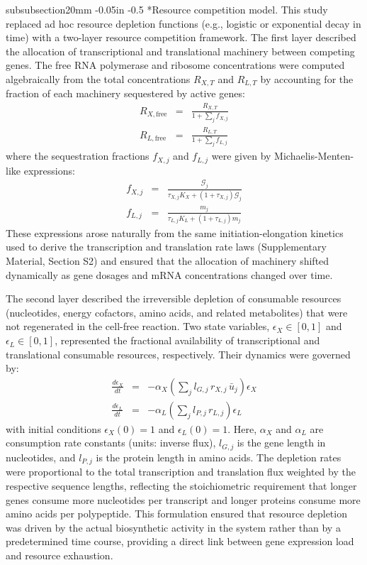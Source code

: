 \documentclass[12pt]{article}
\makeatletter
\renewcommand\subsubsection{\@startsection
	{subsubsection}{2}{0mm}
	{-0.05in}
	{-0.5\baselineskip}
	{\normalfont\normalsize\itshape}}
\makeatother
\begin{document}
\subsubsection*{Resource competition model.}
This study replaced ad hoc resource depletion functions (e.g., logistic or exponential decay in time) with a two-layer resource competition framework. The first layer described the allocation of transcriptional and translational machinery between competing genes. The free RNA polymerase and ribosome concentrations were computed algebraically from the total concentrations $R_{X,T}$ and $R_{L,T}$ by accounting for the fraction of each machinery sequestered by active genes:
\begin{eqnarray}
\label{eq:RNAP_free}
R_{X,\text{free}} &=& \frac{R_{X,T}}{1 + \displaystyle\sum_j f_{X,j}} \\
\label{eq:Ribo_free}
R_{L,\text{free}} &=& \frac{R_{L,T}}{1 + \displaystyle\sum_j f_{L,j}}
\end{eqnarray}
where the sequestration fractions $f_{X,j}$ and $f_{L,j}$ were given by Michaelis-Menten-like expressions:
\begin{eqnarray}
f_{X,j} &=& \frac{\mathcal{G}_j}{\tau_{X,j}K_X + (1 + \tau_{X,j})\mathcal{G}_j} \\
f_{L,j} &=& \frac{m_j}{\tau_{L,j}K_L + (1 + \tau_{L,j})m_j}
\end{eqnarray}
These expressions arose naturally from the same initiation-elongation kinetics used to derive the transcription and translation rate laws (Supplementary Material, Section S2) and ensured that the allocation of machinery shifted dynamically as gene dosages and mRNA concentrations changed over time.

The second layer described the irreversible depletion of consumable resources (nucleotides, energy cofactors, amino acids, and related metabolites) that were not regenerated in the cell-free reaction. Two state variables, $\epsilon_X \in [0,1]$ and $\epsilon_L \in [0,1]$, represented the fractional availability of transcriptional and translational consumable resources, respectively. Their dynamics were governed by:
\begin{eqnarray}
\label{eq:epsX}
\frac{d\epsilon_X}{dt} &=& -\alpha_X \left(\sum_j l_{G,j}\,r_{X,j}\,\bar{u}_j\right)\epsilon_X \\
\label{eq:epsL}
\frac{d\epsilon_L}{dt} &=& -\alpha_L \left(\sum_j l_{P,j}\,r_{L,j}\right)\epsilon_L
\end{eqnarray}
with initial conditions $\epsilon_X(0) = 1$ and $\epsilon_L(0) = 1$. Here, $\alpha_X$ and $\alpha_L$ are consumption rate constants (units: inverse flux), $l_{G,j}$ is the gene length in nucleotides, and $l_{P,j}$ is the protein length in amino acids. The depletion rates were proportional to the total transcription and translation flux weighted by the respective sequence lengths, reflecting the stoichiometric requirement that longer genes consume more nucleotides per transcript and longer proteins consume more amino acids per polypeptide. This formulation ensured that resource depletion was driven by the actual biosynthetic activity in the system rather than by a predetermined time course, providing a direct link between gene expression load and resource exhaustion.
\end{document}
